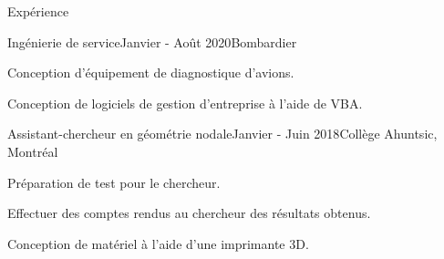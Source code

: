 \documentclass{resume} %
\begin{document}
	
	
	\begin{rSection}{Expérience}
		
		\begin{rSubsection}{Ingénierie de service}{Janvier - Août 2020}{Bombardier}{}{}
			\item Conception d'équipement de diagnostique d'avions.
			\item Conception de logiciels de gestion d'entreprise à l'aide de VBA.
		\end{rSubsection}
		
		\begin{rSubsection}{Assistant-chercheur en géométrie nodale}{Janvier - Juin 2018}{Collège Ahuntsic, Montréal}{}
			\item   Préparation de test pour le chercheur.
			\item   Effectuer des comptes rendus au chercheur des résultats obtenus.
			\item   Conception de matériel à l’aide d’une imprimante 3D.
		\end{rSubsection}
		
		
	\end{rSection}
	
	
	\iffalse
	\begin{rSection}{Accomplissements académiques} 
		\begin{rSubsection}{Collège Ahuntsic, Montréal}{2018}{Bourse d'implication scientifique}
			 
		\end{rSubsection}
		\begin{rSubsection}{Polytechnique Montréal}{2018}{Bourse d'excellence à l'admission}
			  
		\end{rSubsection}
		
	\end{rSection}
	\fi
	
\end{document}
